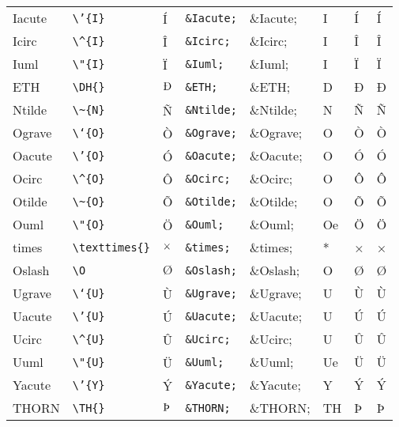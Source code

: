 \documentclass[11pt]{article}
\begin{document}
\begin{longtable}{llllllll}
Iacute & \texttt{\textbackslash{}'\{I\}} & $\mbox{\'{I}}$ & \texttt{\&Iacute;} & \&Iacute; & I & Í & Í\\
Icirc & \texttt{\textbackslash{}\textasciicircum{}\{I\}} & $\mbox{\^{I}}$ & \texttt{\&Icirc;} & \&Icirc; & I & Î & Î\\
Iuml & \texttt{\textbackslash{}"\{I\}} & $\mbox{\"{I}}$ & \texttt{\&Iuml;} & \&Iuml; & I & Ï & Ï\\
ETH & \texttt{\textbackslash{}DH\{\}} & $\mbox{\DH{}}$ & \texttt{\&ETH;} & \&ETH; & D & Ð & Ð\\
Ntilde & \texttt{\textbackslash{}\textasciitilde{}\{N\}} & $\mbox{\~{N}}$ & \texttt{\&Ntilde;} & \&Ntilde; & N & Ñ & Ñ\\
Ograve & \texttt{\textbackslash{}`\{O\}} & $\mbox{\`{O}}$ & \texttt{\&Ograve;} & \&Ograve; & O & Ò & Ò\\
Oacute & \texttt{\textbackslash{}'\{O\}} & $\mbox{\'{O}}$ & \texttt{\&Oacute;} & \&Oacute; & O & Ó & Ó\\
Ocirc & \texttt{\textbackslash{}\textasciicircum{}\{O\}} & $\mbox{\^{O}}$ & \texttt{\&Ocirc;} & \&Ocirc; & O & Ô & Ô\\
Otilde & \texttt{\textbackslash{}\textasciitilde{}\{O\}} & $\mbox{\~{O}}$ & \texttt{\&Otilde;} & \&Otilde; & O & Õ & Õ\\
Ouml & \texttt{\textbackslash{}"\{O\}} & $\mbox{\"{O}}$ & \texttt{\&Ouml;} & \&Ouml; & Oe & Ö & Ö\\
times & \texttt{\textbackslash{}texttimes\{\}} & $\mbox{\texttimes{}}$ & \texttt{\&times;} & \&times; & * & × & ×\\
Oslash & \texttt{\textbackslash{}O} & $\mbox{\O}$ & \texttt{\&Oslash;} & \&Oslash; & O & Ø & Ø\\
Ugrave & \texttt{\textbackslash{}`\{U\}} & $\mbox{\`{U}}$ & \texttt{\&Ugrave;} & \&Ugrave; & U & Ù & Ù\\
Uacute & \texttt{\textbackslash{}'\{U\}} & $\mbox{\'{U}}$ & \texttt{\&Uacute;} & \&Uacute; & U & Ú & Ú\\
Ucirc & \texttt{\textbackslash{}\textasciicircum{}\{U\}} & $\mbox{\^{U}}$ & \texttt{\&Ucirc;} & \&Ucirc; & U & Û & Û\\
Uuml & \texttt{\textbackslash{}"\{U\}} & $\mbox{\"{U}}$ & \texttt{\&Uuml;} & \&Uuml; & Ue & Ü & Ü\\
Yacute & \texttt{\textbackslash{}'\{Y\}} & $\mbox{\'{Y}}$ & \texttt{\&Yacute;} & \&Yacute; & Y & Ý & Ý\\
THORN & \texttt{\textbackslash{}TH\{\}} & $\mbox{\TH{}}$ & \texttt{\&THORN;} & \&THORN; & TH & Þ & Þ\\

\end{longtable}
\end{document}
